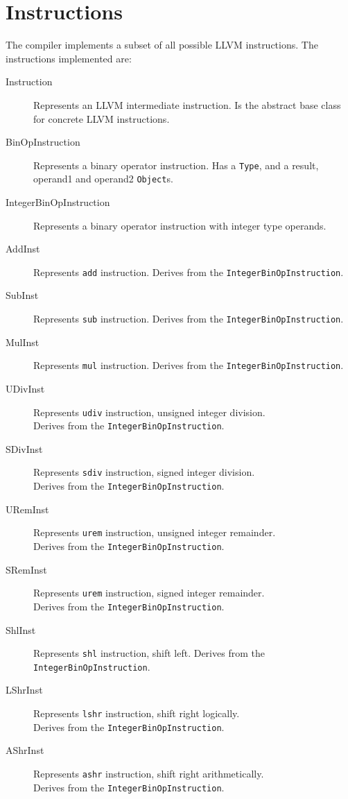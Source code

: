 \documentclass[a4paper,oneside,11pt]{book}
\theoremstyle{definition}
\begin{document}
\section{Instructions}

The compiler implements a subset of all possible LLVM instructions.
The instructions implemented are:

\begin{description}
\item[Instruction]
Represents an LLVM intermediate instruction. Is the abstract base class for concrete LLVM instructions.
\item[BinOpInstruction]
Represents a binary operator instruction.
Has a \verb|Type|, and a result, operand1 and operand2 \verb|Object|s.
\item[IntegerBinOpInstruction]
Represents a binary operator instruction with integer type operands.
\item[AddInst]
Represents \verb|add| instruction. Derives from the \verb|IntegerBinOpInstruction|.
\item[SubInst]
Represents \verb|sub| instruction. Derives from the \verb|IntegerBinOpInstruction|.
\item[MulInst]
Represents \verb|mul| instruction. Derives from the \verb|IntegerBinOpInstruction|.
\item[UDivInst]
Represents \verb|udiv| instruction, unsigned integer division.\\Derives from the \verb|IntegerBinOpInstruction|.
\item[SDivInst]
Represents \verb|sdiv| instruction, signed integer division.\\Derives from the \verb|IntegerBinOpInstruction|.
\item[URemInst]
Represents \verb|urem| instruction, unsigned integer remainder.\\Derives from the \verb|IntegerBinOpInstruction|.
\item[SRemInst]
Represents \verb|urem| instruction, signed integer remainder.\\Derives from the \verb|IntegerBinOpInstruction|.
\item[ShlInst]
Represents \verb|shl| instruction, shift left. Derives from the \verb|IntegerBinOpInstruction|.
\item[LShrInst]
Represents \verb|lshr| instruction, shift right logically.\\Derives from the \verb|IntegerBinOpInstruction|.
\item[AShrInst]
Represents \verb|ashr| instruction, shift right arithmetically.\\Derives from the \verb|IntegerBinOpInstruction|.

\end{description}
\end{document}
